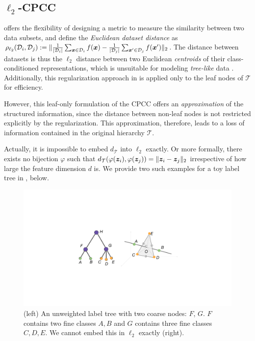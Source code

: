 \subsection{$\ell_2$-CPCC}

 offers the flexibility of designing a metric to measure the similarity between two data subsets, and \citet{zeng2022learning} define the \emph{Euclidean dataset distance} as $\rho_{\ell_2}({\mathcal{D}}_i, {\mathcal{D}}_j) := \|\frac{1}{|{\mathcal{D}}_i|}\sum_{{\bm{x}}\in {\mathcal{D}}_i}f({\bm{x}}) - \frac{1}{|{\mathcal{D}}_j|}\sum_{{\bm{x}}'\in {\mathcal{D}}_j}f({\bm{x}}')\|_2$. The distance between datasets is thus the $\ell_2$ distance between two Euclidean \emph{centroids} of their class-conditioned representations, which is unsuitable for modeling \emph{tree-like} data \citep{chen2013hyperbolicity}. 
Additionally, this regularization approach in \citet{zeng2022learning} is applied only to the leaf nodes of $\mathcal{T}$ for efficiency.

However, this leaf-only formulation of the CPCC offers an \emph{approximation} of the structured information, since the distance between non-leaf nodes is not restricted explicitly by the regularization. This approximation, therefore, leads to a loss of information contained in the original hierarchy $\mathcal{T}$.

Actually, it is impossible to embed $d_\mathcal{T}$ into $\ell_2$ exactly. Or more formally, there exists no bijection $\varphi$ such that $d_\mathcal{T}(\varphi({\bm{z}}_i), \varphi({\bm{z}}_j)) = \lVert {\bm{z}}_i - {\bm{z}}_j \rVert_2$ irrespective of how large the feature dimension $d$ is. We provide two such examples for a toy label tree in , below. 

\begin{figure}
\centering
\includegraphics[width=\linewidth]{figures/l2_failure.pdf}\hspace*{-0.4cm}
\caption{(left) An unweighted label tree with two coarse nodes: $F$, $G$. $F$ contains two fine classes $A,B$ and $G$ contains three fine classes $C,D,E$. We cannot embed this in $\ell_2$ exactly (right).}
\vspace{-1em}
\label{fig:failure}
\end{figure}

